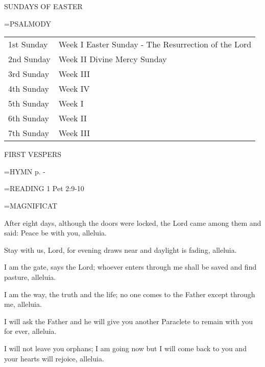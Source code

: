\begin{center}\normalsize SUNDAYS OF EASTER\\
\end{center}

\hangindent=\parindent \small{PSALMODY}
\begin{center}
\begin{tabular}{ l l }
1st Sunday &  Week I Easter Sunday - The Resurrection of the Lord\\
2nd Sunday &  Week II Divine Mercy Sunday\\
3rd Sunday &  Week III\\
4th Sunday &  Week IV\\
5th Sunday &  Week I\\
6th Sunday &  Week II\\
7th Sunday &  Week III\\
\end{tabular}
\end{center}		

\begin{flushleft}\normalsize FIRST VESPERS\\\end{flushleft}

\hangindent=\parindent \small{\uppercase{HYMN} p. \pageref{easter:firstHymn}-\pageref{easter:lastHymn}\\}

\hangindent=\parindent \small{\uppercase{READING}}    1 Pet 2:9-10 \textbf{   \\}

\hangindent=\parindent \small MAGNIFICAT
\begin{description}[labelindent=\parindent, leftmargin=*]
\item [Divine Mercy Sunday:] 	After eight days, although the doors were locked, the Lord came among them and said: Peace be with you, alleluia.
\item [3rd Week:] 	Stay with us, Lord, for evening draws near and daylight is fading, alleluia.
\item [4th Week:] 	I am the gate, says the Lord; whoever enters through me shall be saved and find pasture, alleluia.
\item [5th Week:] 	I am the way, the truth and the life; no one comes to the Father except through me, alleluia.
\item [6th Week:] 	I will ask the Father and he will give you another Paraclete to remain with you for ever, alleluia.
\item [7th Week:] 	I will not leave you orphans; I am going now but I will come back to you and your hearts will rejoice, alleluia.
\end{description}

